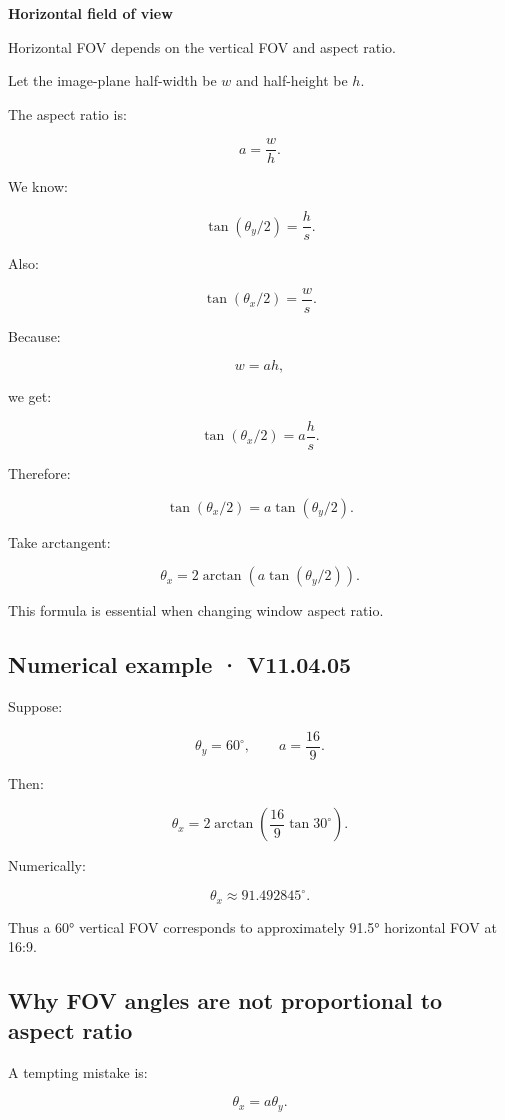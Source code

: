 \textbf{Horizontal field of view}

Horizontal FOV depends on the vertical FOV and aspect ratio.

Let the image-plane half-width be \(w\) and half-height be \(h\).

The aspect ratio is:

\[
 a=\frac wh.
\]

We know:

\[
 \tan(\theta_y/2)=\frac hs.
\]

Also:

\[
 \tan(\theta_x/2)=\frac ws.
\]

Because:

\[
 w=ah,
\]

we get:

\[
 \tan(\theta_x/2) = a\frac hs.
\]

Therefore:

\[
 \boxed{ \tan(\theta_x/2) = a\tan(\theta_y/2) }.
\]

Take arctangent:

\[
 \boxed{ \theta_x= 2\arctan \left( a\tan(\theta_y/2) \right) }.
\]

This formula is essential when changing window aspect ratio.

\subsection{Numerical example · V11.04.05}\label{02-foundations-ii-ch033-numerical-example-v11.04.05}

Suppose:

\[
 \theta_y=60^\circ, \qquad a=\frac{16}{9}.
\]

Then:

\[
 \theta_x= 2\arctan \left( \frac{16}{9}\tan30^\circ \right).
\]

Numerically:

\[
 \boxed{ \theta_x\approx91.492845^\circ }.
\]

Thus a 60° vertical FOV corresponds to approximately 91.5° horizontal FOV at 16:9.

\subsection{Why FOV angles are not proportional to aspect ratio}\label{02-foundations-ii-ch033-why-fov-angles-are-not-proportional-to-aspect-ratio}

A tempting mistake is:

\[
 \theta_x=a\theta_y.
\]

